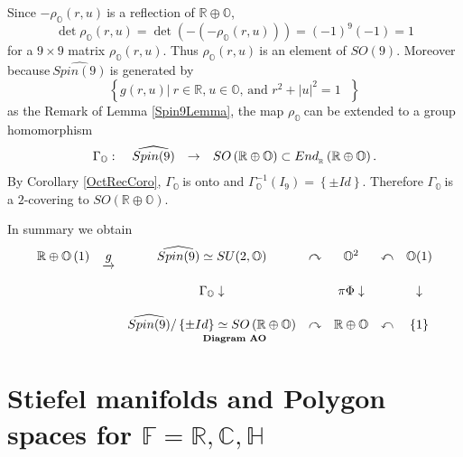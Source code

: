 \documentclass[a4paper]{article}%
\begin{document}
Since $-\rho_{\mathbb{O}}\left(  r,u\right)  \ $is a reflection of
$\mathbb{R\oplus O}$,$\ $
\[
\det\rho_{\mathbb{O}}\left(  r,u\right)  =\det\left(  -\left(  -\rho
_{\mathbb{O}}\left(  r,u\right)  \right)  \right)  =\left(  -1\right)
^{9}\left(  -1\right)  =1
\]
for a $9\times9$ matrix $\rho_{\mathbb{O}}\left(  r,u\right)  $. Thus
$\rho_{\mathbb{O}}\left(  r,u\right)  \ $is an element of $SO\left(  9\right)
$. Moreover because$\ \widehat{Spin(9)}\ $is generated by
\[
\left\{  \left.  g\left(  r,u\right)  \right\vert \ r\in\mathbb{R}%
\text{,}\ u\in\mathbb{O}\text{, and }r^{2}+\left\vert u\right\vert
^{2}=1\text{ }\right\}
\]
as the Remark of Lemma \ref{Spin9Lemma}\thinspace, the map $\rho_{\mathbb{O}%
}\ $can be extended to a group homomorphism
\[%
\begin{array}
[c]{cccc}%
\Gamma_{\mathbb{O}}: & \ \widehat{Spin(9)} & \rightarrow & SO\left(
\mathbb{R\oplus O}\right)  \subset End_{_{\mathbb{R}}}\left(  \mathbb{R\oplus
O}\right)  .
\end{array}
\]
By Corollary \ref{OctRecCoro}, $\Gamma_{\mathbb{O}}\ $is onto and
$\Gamma_{\mathbb{O}}^{-1}\left(  I_{9}\right)  =\left\{  \pm Id\right\}  $.
Therefore $\Gamma_{\mathbb{O}}\ $is a $2$-covering to $SO\left(
\mathbb{R\oplus O}\right)  $.

In summary we obtain%
\[
\underset{\text{\textbf{Diagram AO}}}{%
\begin{array}
[c]{ccccccc}%
\mathbb{R\oplus O}\left(  1\right)  & \underrightarrow{g} & \widehat
{Spin(9)}\simeq SU(2,\mathbb{O}) & \curvearrowright & \mathbb{O}^{2} &
\curvearrowleft & \mathbb{O}(1)\\
&  &  &  &  &  & \\
&  & \Gamma_{\mathbb{O}}\downarrow &  & \pi\Phi\downarrow &  & \downarrow\\
&  &  &  &  &  & \\
&  & \widehat{Spin(9)}/\left\{  \pm Id\right\}  \simeq SO\left(
\mathbb{R\oplus O}\right)  & \curvearrowright & \mathbb{R}\oplus\mathbb{O} &
\curvearrowleft & \left\{  1\right\}
\end{array}
}%
\]


\section{Stiefel manifolds and Polygon spaces for $\mathbb{F}=\mathbb{R}%
,\mathbb{C},\mathbb{H}$}
\end{document}
